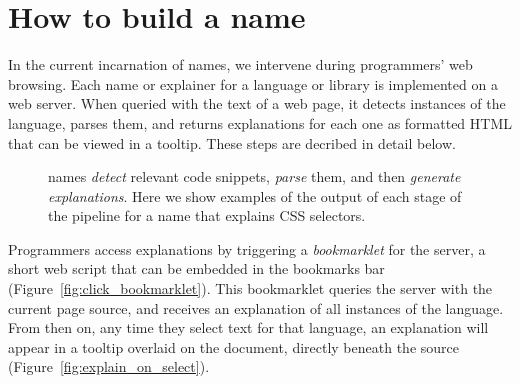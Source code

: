 \section{How to build a \gls{name}}

In the current incarnation of \glspl{name}, we intervene during programmers' web browsing.
Each \gls{name} or explainer for a language or library is implemented on a web server.
When queried with the text of a web page, it detects instances of the language, parses them, and returns explanations for each one as formatted HTML that can be viewed in a tooltip.
These steps are decribed in detail below.

\begin{figure}
\caption{\Glspl{name} \emph{detect} relevant code snippets, \emph{parse} them, and then \emph{generate explanations}.  Here we show examples of the output of each stage of the pipeline for a \gls{name} that explains CSS selectors.}
\label{fig:explanation_pipeline}
\end{figure}

Programmers access explanations by triggering a \emph{bookmarklet} for the server, a short web script that can be embedded in the bookmarks bar (Figure~\ref{fig:click_bookmarklet}).
This bookmarklet queries the server with the current page source, and receives an explanation of all instances of the language.
From then on, any time they select text for that language, an explanation will appear in a tooltip overlaid on the document, directly beneath the source (Figure~\ref{fig:explain_on_select}).

\begin{figure}
\end{figure}

